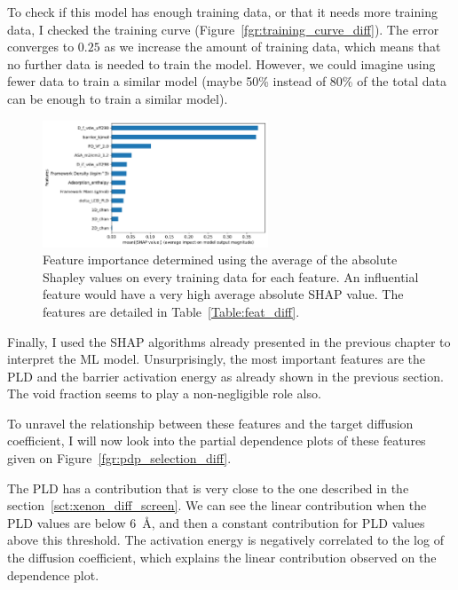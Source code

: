 \documentclass[main]{subfiles}
\begin{document}
To check if this model has enough training data, or that it needs more training data, I checked the training curve (Figure~\ref{fgr:training_curve_diff}). The error converges to $0.25$ as we increase the amount of training data, which means that no further data is needed to train the model. However, we could imagine using fewer data to train a similar model (maybe 50\% instead of 80\% of the total data can be enough to train a similar model). 

\begin{figure}[ht]
  \centering
  \includegraphics[width=0.6\textwidth]{figures/5-diffusion/Diff_Feature_importance_shapbased.pdf}
  \caption{ Feature importance determined using the average of the absolute Shapley values on every training data for each feature. An influential feature would have a very high average absolute SHAP value. The features are detailed in Table~\ref{Table:feat_diff}. }\label{fgr:feat_imp_diff}
\end{figure}

Finally, I used the SHAP algorithms already presented in the previous chapter to interpret the ML model. Unsurprisingly, the most important features are the PLD and the barrier activation energy as already shown in the previous section. The void fraction seems to play a non-negligible role also.

To unravel the relationship between these features and the target diffusion coefficient, I will now look into the partial dependence plots of these features given on Figure~\ref{fgr:pdp_selection_diff}. 

The PLD has a contribution that is very close to the one described in the section~\ref{sct:xenon_diff_screen}. We can see the linear contribution when the PLD values are below \SI{6}{\angstrom}, and then a constant contribution for PLD values above this threshold. The activation energy is negatively correlated to the log of the diffusion coefficient, which explains the linear contribution observed on the dependence plot. 
\end{document}
